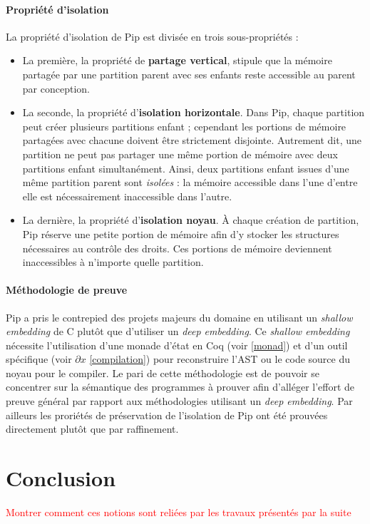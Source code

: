 	\paragraph{Propriété d'isolation} La propriété d'isolation de Pip est divisée en trois sous-propriétés :
	\begin{itemize}
		\item La première, la propriété de \textbf{partage vertical}, stipule que la mémoire partagée par une partition parent avec ses enfants reste accessible au parent par conception.

		\item La seconde, la propriété d'\textbf{isolation horizontale}. Dans Pip, chaque partition peut créer plusieurs partitions enfant ; cependant les portions de mémoire partagées avec chacune doivent être strictement disjointe. Autrement dit, une partition ne peut pas partager une même portion de mémoire avec deux partitions enfant simultanément. Ainsi, deux partitions enfant issues d'une même partition parent sont \emph{isolées} : la mémoire accessible dans l'une d'entre elle est nécessairement inaccessible dans l'autre.

		\item La dernière, la propriété d'\textbf{isolation noyau}. À chaque création de partition, Pip réserve une petite portion de mémoire afin d'y stocker les structures nécessaires au contrôle des droits. Ces portions de mémoire deviennent inaccessibles à n'importe quelle partition.
	\end{itemize}


	\paragraph{Méthodologie de preuve} Pip a pris le contrepied des projets majeurs du domaine en utilisant un \emph{shallow embedding} de C plutôt que d'utiliser un \emph{deep embedding}. Ce \emph{shallow embedding} nécessite l'utilisation d'une monade d'état en Coq (voir \ref{monad}) et d'un outil spécifique (voir $\partial x$ \ref{compilation}) pour reconstruire l'AST ou le code source du noyau pour le compiler.
	Le pari de cette méthodologie est de pouvoir se concentrer sur la sémantique des programmes à prouver afin d'alléger l'effort de preuve général par rapport aux méthodologies utilisant un \emph{deep embedding}. Par ailleurs les proriétés de préservation de l'isolation de Pip ont été prouvées directement plutôt que par raffinement.

	\section{Conclusion}

	\textcolor{red}{Montrer comment ces notions sont reliées par les travaux présentés par la suite}
